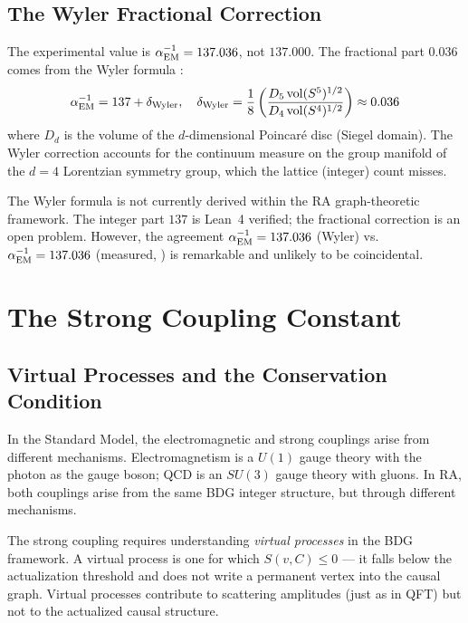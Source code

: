 \documentclass[12pt,a4paper]{article}
\begin{document}
\subsection{The Wyler Fractional Correction}

The experimental value is $\alpha_{\rm EM}^{-1}=137.036$, not $137.000$.  The fractional part $0.036$ comes from the Wyler formula \cite{Wyler1969}:
\begin{equation}
  \alpha_{\rm EM}^{-1} = 137 + \delta_{\rm Wyler}, \quad \delta_{\rm Wyler} = \frac{1}{8}\left(\frac{D_5\,{\rm vol}(S^5)^{1/2}}{D_4\,{\rm vol}(S^4)^{1/2}}\right) \approx 0.036
  \label{eq:wyler}
\end{equation}
where $D_d$ is the volume of the $d$-dimensional Poincar\'e disc (Siegel domain).  The Wyler correction accounts for the continuum measure on the group manifold of the $d=4$ Lorentzian symmetry group, which the lattice (integer) count misses.

The Wyler formula is not currently derived within the RA graph-theoretic framework.  The integer part $137$ is Lean~4 verified; the fractional correction is an open problem.  However, the agreement $\alpha_{\rm EM}^{-1}=137.036$ (Wyler) vs.\ $\alpha_{\rm EM}^{-1}=137.036$ (measured, \cite{PDG2024}) is remarkable and unlikely to be coincidental.

\section{The Strong Coupling Constant}\label{sec:alphas}

\subsection{Virtual Processes and the Conservation Condition}

In the Standard Model, the electromagnetic and strong couplings arise from different mechanisms.  Electromagnetism is a $U(1)$ gauge theory with the photon as the gauge boson; QCD is an $SU(3)$ gauge theory with gluons.  In RA, both couplings arise from the same BDG integer structure, but through different mechanisms.

The strong coupling requires understanding \emph{virtual processes} in the BDG framework.  A virtual process is one for which $S(v,C)\leq0$ --- it falls below the actualization threshold and does not write a permanent vertex into the causal graph.  Virtual processes contribute to scattering amplitudes (just as in QFT) but not to the actualized causal structure.
\end{document}
